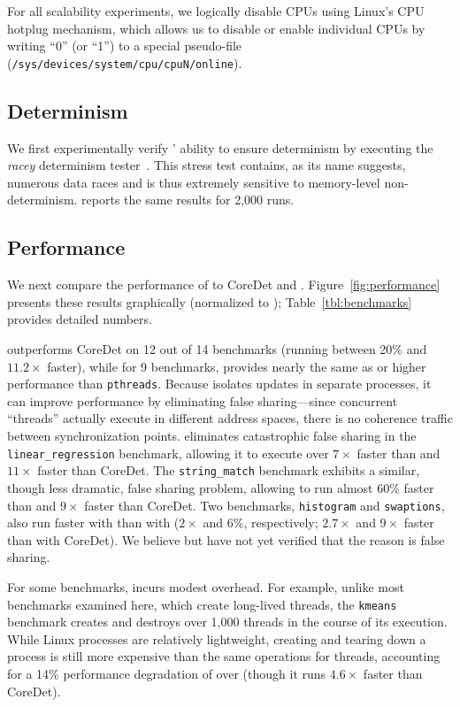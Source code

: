 For all scalability experiments, we logically disable CPUs using
Linux's CPU hotplug mechanism, which allows us to disable or enable
individual CPUs by writing ``0'' (or ``1'') to a special pseudo-file
(\texttt{/sys/devices/system/cpu/cpuN/online}).

\subsection{Determinism}

We first experimentally verify \dthreads{}' ability to ensure
determinism by executing the \emph{racey} determinism
tester~\cite{1508256}. This stress test contains, as its name
suggests, numerous data races and is thus extremely sensitive to
memory-level non-determinism. \dthreads{} reports the same results for
2,000 runs.

\subsection{Performance}
\label{sec:performance}

We next compare the performance of \dthreads{} to CoreDet
and \pthreads{}. Figure~\ref{fig:performance} presents these results
graphically (normalized to \pthreads{}); Table~\ref{tbl:benchmarks}
provides detailed numbers.

\dthreads{} outperforms CoreDet on 12 out
of 14 benchmarks (running between 20\% and $11.2\times$ faster), while
for 9 benchmarks, \dthreads{} provides nearly the same as or higher
performance than \texttt{pthreads}. Because \dthreads{} isolates
updates in separate processes, it can improve performance by
eliminating false sharing---since concurrent ``threads'' actually
execute in different address spaces, there is no coherence traffic
between synchronization points. \dthreads{} eliminates catastrophic
false sharing in the \texttt{linear\_regression} benchmark, allowing
it to execute over $7\times$ faster than \pthreads{} and $11\times$
faster than CoreDet. The \texttt{string\_match} benchmark exhibits a
similar, though less dramatic, false sharing problem,
allowing \dthreads{} to run almost 60\% faster than \pthreads{} and
$9\times$ faster than CoreDet. Two benchmarks, \texttt{histogram}
and \texttt{swaptions}, also run faster with \dthreads{} than
with \pthreads{} ($2\times$ and $6\%$, respectively; $2.7\times$ and
$9\times$ faster than with CoreDet). We believe but have not yet
verified that the reason is false sharing.

For some benchmarks, \dthreads{} incurs modest overhead. For example,
unlike most benchmarks examined here, which create long-lived threads,
the
\texttt{kmeans} benchmark creates and destroys over 1,000 threads in the course of its execution. 
While Linux processes are relatively lightweight, creating and tearing
down a process is still more expensive than the same operations for
threads, accounting for a 14\% performance degradation of \dthreads{}
over \pthreads{} (though it runs $4.6\times$ faster than CoreDet).

